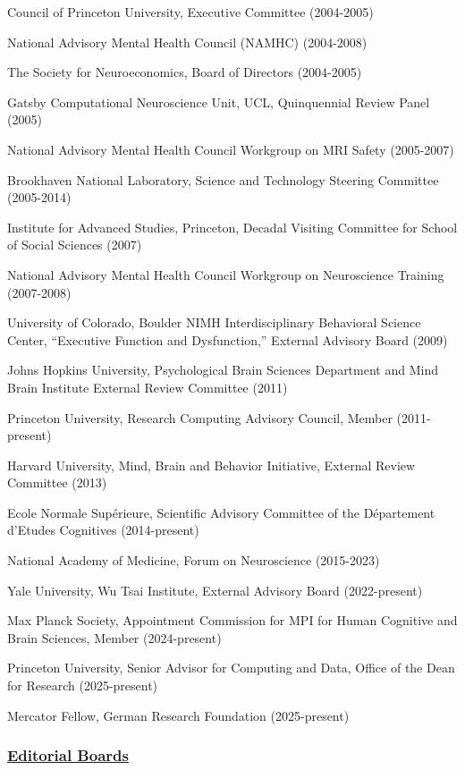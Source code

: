 \documentclass[10 pt]{article}
\begin{document}
Council of Princeton University, Executive Committee (2004-2005)

National Advisory Mental Health Council (NAMHC) (2004-2008)

The Society for Neuroeconomics, Board of Directors (2004-2005)

Gatsby Computational Neuroscience Unit, UCL, Quinquennial Review Panel (2005)

National Advisory Mental Health Council Workgroup on MRI Safety (2005-2007)

Brookhaven National Laboratory, Science and Technology Steering Committee (2005-2014)

Institute for Advanced Studies, Princeton, Decadal Visiting Committee for School of Social Sciences (2007)

National Advisory Mental Health Council Workgroup on Neuroscience Training (2007-2008)

University of Colorado, Boulder NIMH Interdisciplinary Behavioral Science Center, “Executive Function and Dysfunction,” External Advisory Board (2009)

Johns Hopkins University, Psychological Brain Sciences Department and Mind Brain Institute External Review Committee (2011)

Princeton University, Research Computing Advisory Council, Member (2011-present)

Harvard University, Mind, Brain and Behavior Initiative, External Review Committee (2013)

Ecole Normale Supérieure, Scientific Advisory Committee of the Département d'Etudes Cognitives (2014-present)

National Academy of Medicine, Forum on Neuroscience (2015-2023)

Yale University, Wu Tsai Institute, External Advisory Board (2022-present)

Max Planck Society, Appointment Commission for MPI for Human Cognitive and Brain Sciences, Member (2024-present)

Princeton University, Senior Advisor for Computing and Data, Office of the Dean for Research (2025-present)

Mercator Fellow, German Research Foundation (2025-present)

\subsubsection*{\underline{Editorial Boards}} \label{secEB}
    \smallskip
\end{document}
